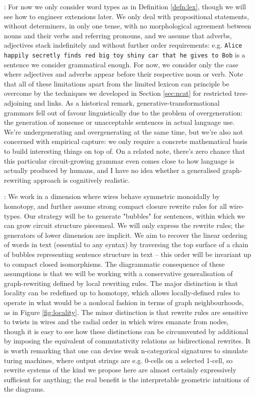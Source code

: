 : For now we only consider word types as in Definition \ref{defn:lex}, though we will see how to engineer extensions later. We only deal with propositional statements, without determiners, in only one tense, with no morphological agreement between nouns and their verbs and referring pronouns, and we assume that adverbs, adjectives stack indefinitely and without further order requirements: e.g. \texttt{Alice happily secretly finds red big toy shiny car that he gives to Bob} is a sentence we consider grammatical enough. For now, we consider only the case where adjectives and adverbs appear before their respective noun or verb. Note that all of these limitations apart from the limited lexicon can principle be overcome by the techniques we developed in Section \ref{sec:ncat} for restricted tree-adjoining and links. As a historical remark, generative-transformational grammars fell out of favour linguistically due to the problem of overgeneration: the generation of nonsense or unacceptable sentences in actual language use. We're undergenerating and overgenerating at the same time, but we're also not concerned with empirical capture: we only require a concrete mathematical basis to build interesting things on top of. On a related note, there's zero chance that this particular circuit-growing grammar even comes close to how language is actually produced by humans, and I have no idea whether a generalised graph-rewriting approach is cognitively realistic.

: We work in a dimension where wires behave symmetric monoidally by homotopy, and further assume strong compact closure rewrite rules for all wire-types. Our strategy will be to generate "bubbles" for sentences, within which we can grow circuit structure piecemeal. We will only express the rewrite rules; the generators of lower dimension are implicit. We aim to recover the linear ordering of words in text (essential to any syntax) by traversing the top surface of a chain of bubbles representing sentence structure in text -- this order will be invariant up to compact closed isomorphisms. The diagrammatic consequence of these assumptions is that we will be working with a conservative generalisation of graph-rewriting defined by local rewriting rules. The major distinction is that locality can be redefined up to homotopy, which allows locally-defined rules to operate in what would be a nonlocal fashion in terms of graph neighbourhoods, as in Figure \ref{fig:locality}. The minor distinction is that rewrite rules are sensitive to twists in wires and the radial order in which wires emanate from nodes, though it is easy to see how these distinctions can be circumvented by additional by imposing the equivalent of commutativity relations as bidirectional rewrites. It is worth remarking that one can devise weak n-categorical signatures to simulate turing machines, where output strings are e.g. 0-cells on a selected 1-cell, so rewrite systems of the kind we propose here are almost certainly expressively sufficient for anything; the real benefit is the interpretable geometric intuitions of the diagrams.

